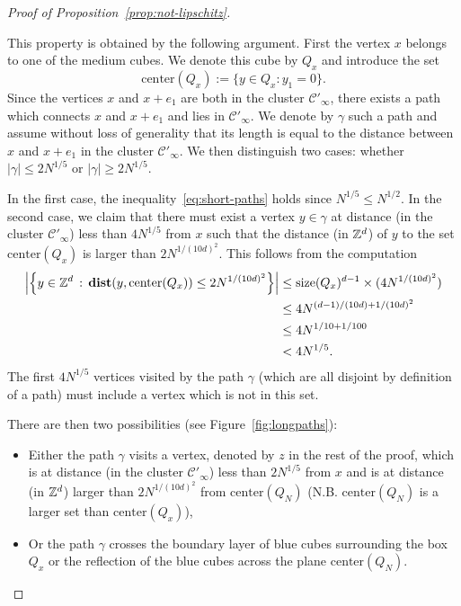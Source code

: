 \documentclass[12pt]{amsart}
\numberwithin{equation}{section}
\begin{document}
\begin{proof}[Proof of Proposition~\ref{prop:not-lipschitz}]
\begin{itemize}
			This property is obtained by the following argument. First the vertex $x$ belongs to one of the medium cubes. We denote this cube by $Q_x$ and introduce the set
			\begin{equation*}
				\mbox{center}(Q_x) := \{ y \in Q_x : y_1 = 0 \}.
			\end{equation*}
			Since the vertices $x$ and $x + e_1$ are both in the cluster $\mathscr{C}'_{\infty}$, there exists a path which connects $x$ and $x + e_1$ and lies in $\mathscr{C}'_{\infty}$. We denote by $\gamma$ such a path and assume without loss of generality that its length is equal to the distance between $x$ and $x + e_1$ in the cluster $\mathscr{C}'_{\infty}$. We then distinguish two cases: whether $|\gamma| \leq 2N^{1/5}$ or $|\gamma| \geq 2N^{1/5}$.
			
			In the first case, the inequality~\eqref{eq:short-paths} holds since $N^{1/5} \leq N^{1/2}$. In the second case, we claim that there must exist a vertex $y \in \gamma$ at distance (in the cluster $\mathscr{C}'_{\infty}$) less than $4 N^{1/5}$ from $x$ such that the distance (in $\mathbb{Z}^d$) of $y$ to the set $\mbox{center}(Q_x)$ is larger than $2 N^{1/(10d)^2}$. This follows from the computation
			\begin{align*}
				\left| \left\{ y \in \mathbb{Z}^d \, : \, \operatorname{\mathop{\bf dist{}}}(y , \mbox{center}(Q_x)) \leq 2N^{1/(10d)^2} \right\}  \right| & \leq \mathrm{size}(Q_x)^{d-1} \times (4 N^{1/(10d)^2}) \\
				& \leq 4 N^{(d-1)/(10d) + 1/(10d)^2} \\
				& \leq 4 N^{1/10 + 1/100} \\
				& < 4 N^{1/5}.
			\end{align*}
			The first $4 N^{1/5}$ vertices visited by the path $\gamma$ (which are all disjoint by definition of a path) must include a vertex which is not in this set.
			
			There are then two possibilities (see Figure~\ref{fig:longpaths}):
			\begin{itemize}
				\item Either the path $\gamma$ visits a vertex, denoted by $z$ in the rest of the proof, which is at distance (in the cluster $\mathscr{C}'_{\infty}$) less than $2N^{1/5}$ from $x$ and is at distance (in $\mathbb{Z}^d$) larger than $2N^{1/(10d)^2}$ from $\mbox{center}(Q_N)$ (N.B. $\mbox{center}(Q_N)$ is a larger set than $\mbox{center}(Q_x)$),
				\item Or the path $\gamma$ crosses the boundary layer of blue cubes surrounding the box $Q_x$ or the reflection of the blue cubes across the plane $\mbox{center}(Q_N)$.
			\end{itemize}
			

\end{itemize}
\end{proof}
\end{document}
